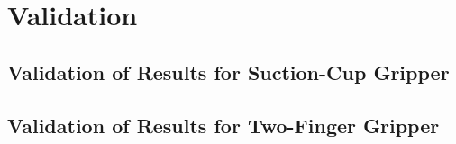 \chapter{Validation}
\label{sec:validation}

\section{Validation of Results for Suction-Cup Gripper}

\section{Validation of Results for Two-Finger Gripper}
